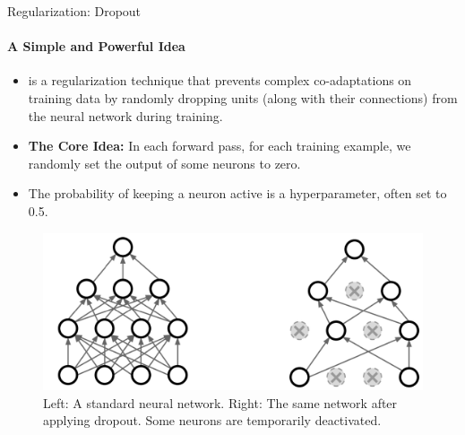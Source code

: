\begin{frame}{Regularization: Dropout}
    \framesubtitle{A Simple and Powerful Idea}
    \small
    \begin{itemize}
        \item {} is a regularization technique that prevents complex co-adaptations on training data by randomly dropping units (along with their connections) from the neural network during training.
        \item \textbf{The Core Idea:} In each forward pass, for each training example, we randomly set the output of some neurons to zero.
        \item The probability of keeping a neuron active is a hyperparameter, often set to 0.5.
    \end{itemize}
    \begin{figure}
        \centering
        \includegraphics[width=0.7\linewidth]{images/dropout_idea.png}
        \caption{Left: A standard neural network. Right: The same network after applying dropout. Some neurons are temporarily deactivated.}
    \end{figure}
\end{frame}

